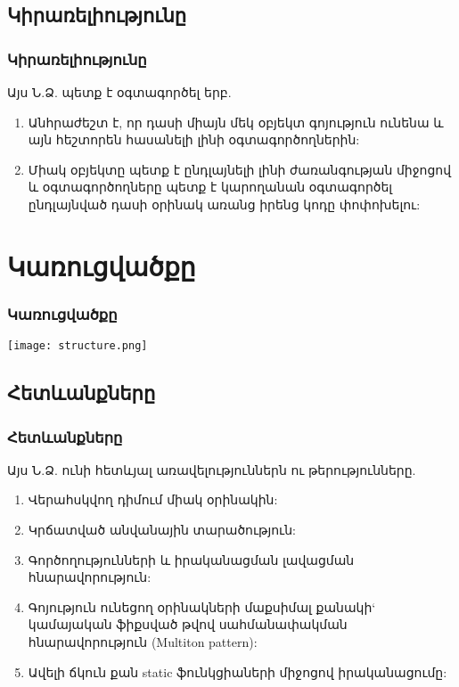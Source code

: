 \documentclass{beamer}
\begin{document}
\subsection{Կիրառելիությունը}
\begin{frame}\frametitle{Կիրառելիությունը}
Այս Ն.Ձ. պետք է օգտագործել երբ.
\vfill
\begin{enumerate}
    \item Անհրաժեշտ է, որ դասի միայն մեկ օբյեկտ գոյություն ունենա և
    այն հեշտորեն հասանելի լինի օգտագործողներին: \pause \vfill
    \item Միակ օբյեկտը պետք է ընդլայնելի լինի ժառանգության միջոցով և
    օգտագործողները պետք է կարողանան օգտագործել ընդլայնված դասի
    օրինակ առանց իրենց կոդը փոփոխելու:
\end{enumerate}
\end{frame}

\section{Կառուցվածքը}
\begin{frame}\frametitle{Կառուցվածքը}
\begin{center}
    \texttt{[image: structure.png]}
\end{center}
\end{frame}

\subsection{Հետևանքները}
\begin{frame}\frametitle{Հետևանքները}
Այս Ն.Ձ. ունի հետևյալ առավելություններն ու թերությունները.
\vfill
\begin{enumerate}
    \item Վերահսկվող դիմում միակ օրինակին: \pause \vfill
    \item Կրճատված անվանային տարածություն: \pause \vfill
    \item Գործողությունների և իրականացման լավացման հնարավորություն: \pause \vfill
    \item Գոյություն ունեցող օրինակների մաքսիմալ քանակի` կամայական
    ֆիքսված թվով սահմանափակման հնարավորություն (Multiton pattern): \pause \vfill
    \item Ավելի ճկուն քան static ֆունկցիաների միջոցով իրականացումը:
\end{enumerate}
\end{frame}
\end{document}

